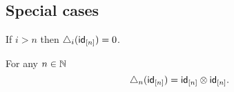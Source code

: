 \subsection{Special cases}


\begin{lemma}
	If $i > n$ then $\triangle_i(\mathsf{id}_{[n]}) = 0$.
\end{lemma}


\begin{lemma} \label{lemma: triangle_n of n = n x n}
    For any $n \in \mathbb{N}$
    \[
    \triangle_n(\mathsf{id}_{[n]}) = \mathsf{id}_{[n]} \otimes \mathsf{id}_{[n]}.
    \]
\end{lemma}

%

